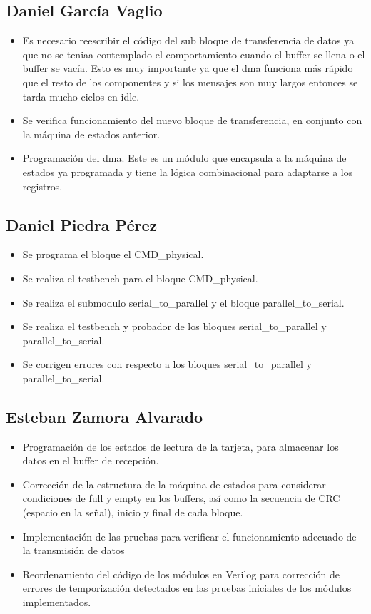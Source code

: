 \subsection{Daniel García Vaglio}
\begin{itemize}
\item Es necesario reescribir el código del sub bloque de transferencia de datos ya que no se teniaa
  contemplado el comportamiento cuando el buffer se llena o el buffer se vacía. Esto es muy
  importante ya que el dma funciona más rápido que el resto de los componentes y si los mensajes son
  muy largos entonces se tarda mucho ciclos en idle. 
\item Se verifica funcionamiento del nuevo bloque de transferencia, en conjunto con la máquina de
  estados anterior. 
\item Programación del dma. Este es un módulo que encapsula a la máquina de estados ya programada y
  tiene la lógica combinacional para adaptarse a los registros. 
\end{itemize}
\subsection{Daniel Piedra Pérez}
\begin{itemize}
\item Se programa el bloque el CMD\_physical.
\item Se realiza el testbench para el bloque CMD\_physical.
\item Se realiza el submodulo serial\_to\_parallel y el bloque parallel\_to\_serial.
\item Se realiza el testbench y probador de los bloques serial\_to\_parallel y parallel\_to\_serial.
\item Se corrigen errores con respecto a los bloques serial\_to\_parallel y parallel\_to\_serial.
\end{itemize}

\subsection{Esteban Zamora Alvarado}
\begin{itemize}
\item Programación de los estados de lectura de la tarjeta, para almacenar los datos en el buffer de recepción. 
\item Corrección de la estructura de la máquina de estados para considerar condiciones de full y
  empty en los buffers, así como la secuencia de CRC (espacio en la señal), inicio y final de cada bloque.
\item Implementación de las pruebas para verificar el funcionamiento adecuado de la transmisión de datos
\item Reordenamiento del código de los módulos en Verilog para corrección de errores de
  temporización detectados en las pruebas iniciales de los módulos implementados.
\end{itemize}
\newpage

